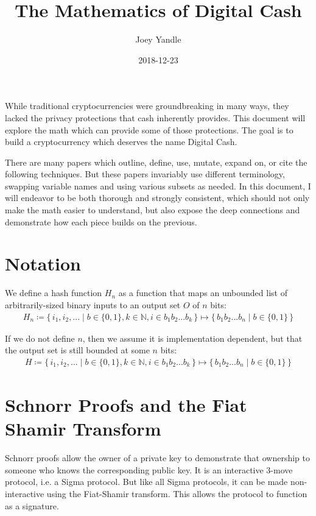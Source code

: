 \documentclass{article}
\title{The Mathematics of Digital Cash}
\date{2018-12-23}
\author{Joey Yandle}
\newcommand\Set[2]{\{\,#1\mid#2\,\}}
\begin{document}
\maketitle

While traditional cryptocurrencies were groundbreaking in many ways, they lacked the privacy protections that cash inherently provides.  This document will explore the math which can provide some of those protections.  The goal is to build a cryptocurrency which deserves the name Digital Cash.

There are many papers which outline, define, use, mutate, expand on, or cite the following techniques.  But these papers invariably use different terminology, swapping variable names and using various subsets as needed.  In this document, I will endeavor to be both thorough and strongly consistent, which should not only make the math easier to understand, but also expose the deep connections and demonstrate how each piece builds on the previous.
\newpage


\section{
  Notation
}

We define a hash function $H_n$ as a function that maps an unbounded list of arbitrarily-sized binary inputs to an output set $O$ of $n$ bits:
\begin{align}
  H_n \coloneqq \Set{i_1, i_2, ...}{b \in \{0,1\}, k \in \mathbb{N}, i \in {b_1b_2...b_k}} \mapsto \Set{b_1b_2...b_n}{b \in \{0,1\}}
\end{align}

If we do not define $n$, then we assume it is implementation dependent, but that the output set is still bounded at some $n$ bits:
\begin{align}
  H \coloneqq \Set{i_1, i_2, ...}{b \in \{0,1\}, k \in \mathbb{N}, i \in {b_1b_2...b_k}} \mapsto \Set{b_1b_2...b_n}{b \in \{0,1\}}
\end{align}


\section{
  Schnorr Proofs and the Fiat Shamir Transform
}

Schnorr proofs allow the owner of a private key to demonstrate that ownership to someone who knows the corresponding public key.  It is an interactive 3-move protocol, i.e. a Sigma protocol.  But like all Sigma protocols, it can be made non-interactive using the Fiat-Shamir transform.  This allows the protocol to function as a signature.
\end{document}
